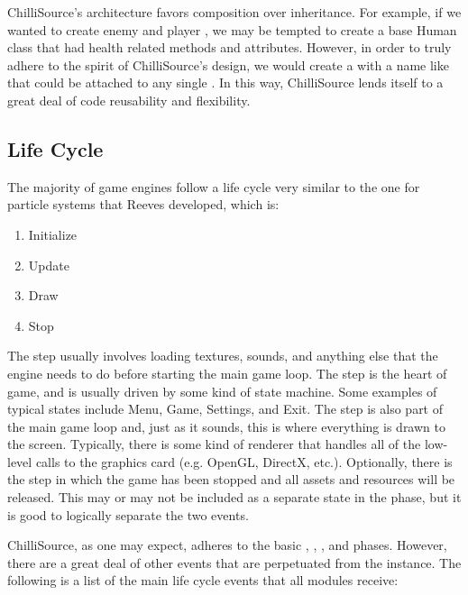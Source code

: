 ChilliSource's architecture favors composition over inheritance. For example, if we wanted to create enemy and player , we may be tempted to create a base Human  class that had health related methods and attributes. However, in order to truly adhere to the spirit of ChilliSource's design, we would create a  with a name like  that could be attached to any single . In this way, ChilliSource lends itself to a great deal of code reusability and flexibility.

\subsection{Life Cycle}\label{ssec:cs_engine_lifecycle}

The majority of game engines follow a life cycle very similar to the one for particle systems that Reeves developed, which is: 

\begin{enumerate}[nolistsep,topsep=10pt]
	\item Initialize
	\item Update
	\item Draw
	\item Stop
\end{enumerate}

The  step usually involves loading textures, sounds, and anything else that the engine needs to do before starting the main game loop. The  step is the heart of game, and is usually driven by some kind of state machine. Some examples of typical states include Menu, Game, Settings, and Exit. The  step is also part of the main game loop and, just as it sounds, this is where everything is drawn to the screen. Typically, there is some kind of renderer that handles all of the low-level calls to the graphics card (e.g. OpenGL, DirectX, etc.). Optionally, there is the  step in which the game has been stopped and all assets and resources will be released. This may or may not be included as a separate state in the  phase, but it is good to logically separate the two events.

ChilliSource, as one may expect, adheres to the basic , , , and  phases. However, there are a great deal of other events that are perpetuated from the  instance. The following is a list of the main life cycle events that all modules receive:

